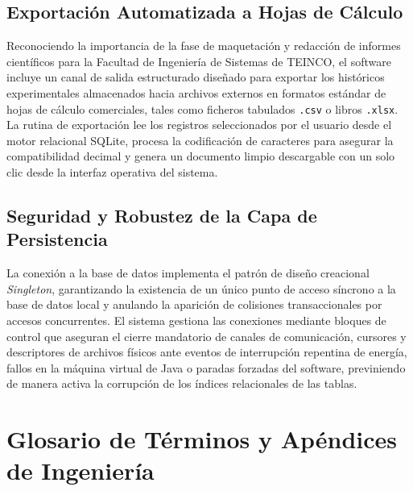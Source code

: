 \documentclass[11pt,a4paper]{article}
\begin{document}
	\subsection{Exportación Automatizada a Hojas de Cálculo}
	Reconociendo la importancia de la fase de maquetación y redacción de informes científicos para la Facultad de Ingeniería de Sistemas de TEINCO, el software incluye un canal de salida estructurado diseñado para exportar los históricos experimentales almacenados hacia archivos externos en formatos estándar de hojas de cálculo comerciales, tales como ficheros tabulados \texttt{.csv} o libros \texttt{.xlsx}. La rutina de exportación lee los registros seleccionados por el usuario desde el motor relacional SQLite, procesa la codificación de caracteres para asegurar la compatibilidad decimal y genera un documento limpio descargable con un solo clic desde la interfaz operativa del sistema.
	
	\subsection{Seguridad y Robustez de la Capa de Persistencia}
	La conexión a la base de datos implementa el patrón de diseño creacional \textit{Singleton}, garantizando la existencia de un único punto de acceso síncrono a la base de datos local y anulando la aparición de colisiones transaccionales por accesos concurrentes. El sistema gestiona las conexiones mediante bloques de control que aseguran el cierre mandatorio de canales de comunicación, cursores y descriptores de archivos físicos ante eventos de interrupción repentina de energía, fallos en la máquina virtual de Java o paradas forzadas del software, previniendo de manera activa la corrupción de los índices relacionales de las tablas.
	
	\section{Glosario de Términos y Apéndices de Ingeniería}
	
\end{document}
